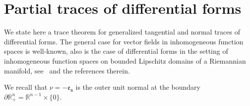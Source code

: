 \documentclass[AHL,Unicode,longabstracts,published]{cedram}
\newcommand{\bbR}{\mathbb{R}}
\begin{document}
\appendix

\section{Partial traces of differential forms}\label{Append:TracesofFunctions}

We state here a trace theorem for generalized tangential and normal traces of differential forms. The general case for vector fields in inhomogeneous function spaces is well-known, also is the case of differential forms in the setting of inhomogeneous function spaces on bounded Lipschitz domains of a Riemannian manifold, see~\cite[Section~4]{MitreaMitreaShaw2008} and the references therein.


We recall that $\nu=-\mathfrak{e_n}$ is the outer unit normal at the boundary $\partial\bbR^n_+=\bbR^{n-1}\times\{0\}$.
\end{document}
